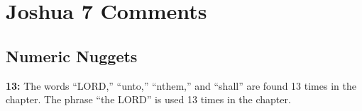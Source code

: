 \section{Joshua 7 Comments}

\subsection{Numeric Nuggets}
\textbf{13: } The words  ``LORD,'' ``unto,'' ``nthem,'' and ``shall'' are found 13 times in the chapter. The phrase ``the LORD'' is used 13 times in the chapter.

